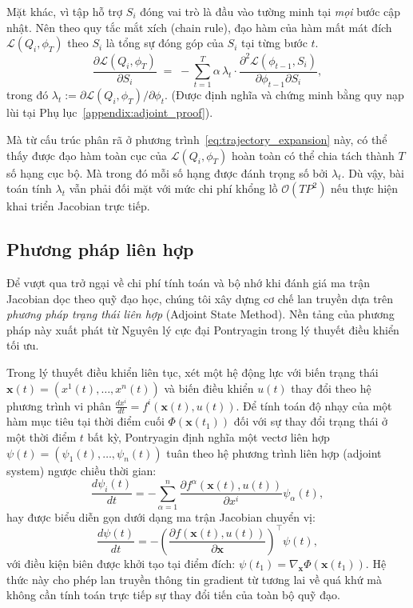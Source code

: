 Mặt khác, vì tập hỗ trợ $S_i$ đóng vai trò là đầu vào tường minh tại \emph{mọi} bước cập nhật. Nên theo quy tắc mắt xích (chain rule), đạo hàm của hàm mất mát đích $\mathcal{L}(Q_i, \phi_T)$ theo $S_i$ là tổng sự đóng góp của $S_i$ tại từng bước $t$.
\begin{equation}
    \frac{\partial \mathcal{L}(Q_i,\phi_{T})}{\partial S_i} \;=\; -\sum_{t=1}^{T} \alpha\, \lambda_t \cdot \frac{\partial^2 \mathcal{L}(\phi_{t-1}, S_i)}{\partial \phi_{t-1} \partial S_i},
    \label{eq:trajectory_expansion}
\end{equation}
trong đó $\lambda_t := \partial \mathcal{L}(Q_i,\phi_T)/\partial \phi_t$. (Được định nghĩa và chứng minh bằng quy nạp lùi tại Phụ lục~\ref{appendix:adjoint_proof}).

Mà từ cấu trúc phân rã ở phương trình~\eqref{eq:trajectory_expansion} này, có thể thấy được đạo hàm toàn cục của $\mathcal{L}(Q_i,\phi_T)$ hoàn toàn có thể chia tách thành $T$ số hạng cục bộ. Mà trong đó mỗi số hạng được đánh trọng số bởi $\lambda_t$. Dù vậy, bài toán tính $\lambda_t$ vẫn phải đối mặt với mức chi phí khổng lồ $\mathcal{O}(TP^2)$ nếu thực hiện khai triển Jacobian trực tiếp.

\subsection{Phương pháp liên hợp}
\label{subsec:adjoint}

Để vượt qua trở ngại về chi phí tính toán và bộ nhớ khi đánh giá ma trận Jacobian dọc theo quỹ đạo học, chúng tôi xây dựng cơ chế lan truyền dựa trên \emph{phương pháp trạng thái liên hợp} (Adjoint State Method). Nền tảng của phương pháp này xuất phát từ Nguyên lý cực đại Pontryagin trong lý thuyết điều khiển tối ưu.

Trong lý thuyết điều khiển liên tục, xét một hệ động lực với biến trạng thái $\mathbf{x}(t) = (x^1(t), \dots, x^n(t))$ và biến điều khiển $u(t)$ thay đổi theo hệ phương trình vi phân $\frac{dx^i}{dt} = f^i(\mathbf{x}(t), u(t))$. Để tính toán độ nhạy của một hàm mục tiêu tại thời điểm cuối $\Phi(\mathbf{x}(t_1))$ đối với sự thay đổi trạng thái ở một thời điểm $t$ bất kỳ, Pontryagin định nghĩa một vectơ liên hợp $\psi(t) = (\psi_1(t), \dots, \psi_n(t))$ tuân theo hệ phương trình liên hợp (adjoint system) ngược chiều thời gian:
\begin{equation}
    \frac{d\psi_i(t)}{dt} = - \sum_{\alpha=1}^n \frac{\partial f^\alpha(\mathbf{x}(t), u(t))}{\partial x^i} \psi_\alpha(t),
    \label{eq:pontryagin_continuous_component}
\end{equation}
hay được biểu diễn gọn dưới dạng ma trận Jacobian chuyển vị:
\begin{equation}
    \frac{d\psi(t)}{dt} = - \left( \frac{\partial f(\mathbf{x}(t), u(t))}{\partial \mathbf{x}} \right)^\top \psi(t),
    \label{eq:pontryagin_continuous}
\end{equation}
với điều kiện biên được khởi tạo tại điểm đích: $\psi(t_1) = \nabla_{\mathbf{x}} \Phi(\mathbf{x}(t_1))$. Hệ thức này cho phép lan truyền thông tin gradient từ tương lai về quá khứ mà không cần tính toán trực tiếp sự thay đổi tiến của toàn bộ quỹ đạo.

